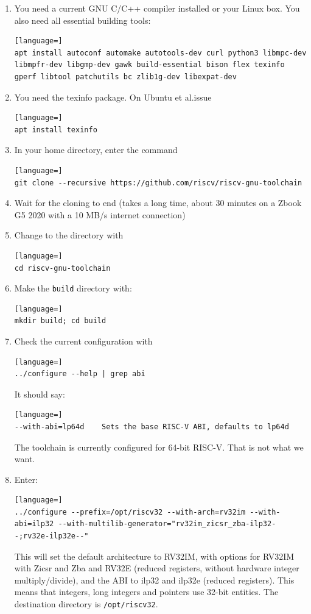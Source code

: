 \documentclass[12pt]{article}
\begin{document}
\begin{enumerate}
\item You need a current GNU C/C++ compiler installed or your Linux box. You also need all essential building tools:
\begin{lstlisting}[language=]
apt install autoconf automake autotools-dev curl python3 libmpc-dev libmpfr-dev libgmp-dev gawk build-essential bison flex texinfo gperf libtool patchutils bc zlib1g-dev libexpat-dev
\end{lstlisting}
\item You need the texinfo package. On Ubuntu et al.\@ issue
\begin{lstlisting}[language=]
apt install texinfo
\end{lstlisting}
\item In your home directory, enter the command
\begin{lstlisting}[language=]
git clone --recursive https://github.com/riscv/riscv-gnu-toolchain
\end{lstlisting}
\item Wait for the cloning to end (takes a long time, about 30 minutes on a Zbook G5 2020 with a 10 MB/s internet connection)
\item Change to the directory with
\begin{lstlisting}[language=]
cd riscv-gnu-toolchain
\end{lstlisting}
\item Make the \lstinline|build| directory with:
\begin{lstlisting}[language=]
mkdir build; cd build
\end{lstlisting}
\item Check the current configuration with
\begin{lstlisting}[language=]
../configure --help | grep abi
\end{lstlisting}
      It should say:
\begin{lstlisting}[language=]
--with-abi=lp64d    Sets the base RISC-V ABI, defaults to lp64d
\end{lstlisting}
The toolchain is currently configured for 64-bit RISC-V. That is not what we want.
\item Enter:
\begin{lstlisting}[language=]
../configure --prefix=/opt/riscv32 --with-arch=rv32im --with-abi=ilp32 --with-multilib-generator="rv32im_zicsr_zba-ilp32--;rv32e-ilp32e--"
\end{lstlisting}
This will set the default architecture to RV32IM, with options for RV32IM with Zicsr and Zba and RV32E (reduced registers, without hardware integer multiply/divide), and the ABI to ilp32 and ilp32e (reduced registers). This means that integers, long integers and pointers use 32-bit entities. The destination directory is \lstinline|/opt/riscv32|.


\end{enumerate}
\end{document}
